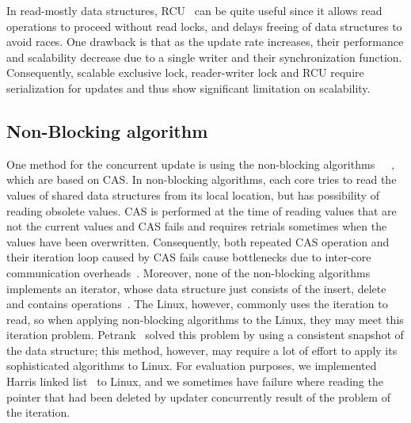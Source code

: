 In read-mostly data structures, RCU~\cite{McKenney98} can be quite useful
since it allows read operations to proceed without read locks, and delays
freeing of data structures to avoid races. One drawback is that as the update
rate increases, their performance and scalability decrease due to a single
writer and their synchronization function.
Consequently, 
scalable exclusive lock, reader-writer lock
and RCU require serialization for updates and thus show significant limitation on 
scalability. 

\subsection{Non-Blocking algorithm}

One method for the concurrent update is using the non-blocking
algorithms~\cite{Harris2001Lockfree}~\cite{Fomitchev2004Lockfree}~\cite{Timnat2012}, which are based on CAS.
In non-blocking algorithms, each core tries to read the values of shared
data structures from its local location, but has possibility of reading 
obsolete values.
CAS is performed at the time of reading values that are not the current values
and CAS fails and requires retrials sometimes when the values have been overwritten.
Consequently, both repeated CAS operation and their iteration loop caused by
CAS fails cause bottlenecks due to inter-core communication overheads~\cite{SilasBoydWickizerPth}.
Moreover, none of the non-blocking algorithms implements an iterator, whose
data structure just consists of the insert, delete and contains
operations~\cite{petrank2013lock}.
The Linux, however, commonly uses the iteration to read, so when applying
non-blocking algorithms to the Linux, they may meet this iteration problem.
Petrank~\cite{petrank2013lock} solved this problem by using a consistent
snapshot of the data structure; this method, however, may require a lot of
effort to apply its sophisticated algorithms to Linux.
For evaluation purposes, we implemented Harris linked
list~\cite{Harris2001Lockfree} to Linux, and we sometimes have failure where
reading the pointer that had been deleted by updater concurrently result of the
problem of the iteration.

